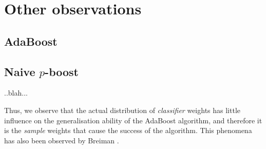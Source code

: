 \section{Other observations}

\subsection{AdaBoost}

\subsection{Naive $p$-boost}

..blah...

Thus, we observe that the actual distribution of \emph{classifier}
weights has little influence on the generalisation ability of the
AdaBoost algorithm, and therefore it is the \emph{sample} weights that
cause the success of the algorithm.  This phenomena has also been
observed by Breiman \cite{Breiman96}.

